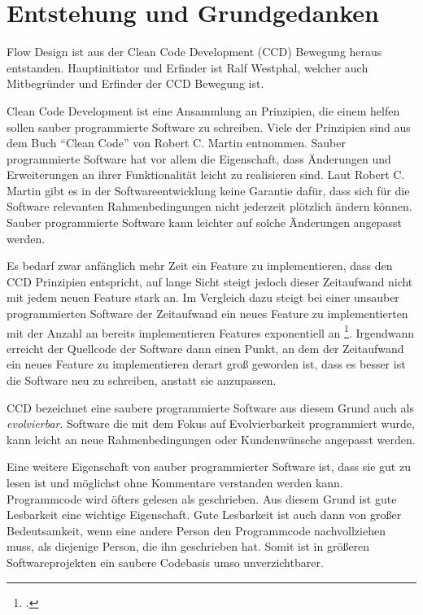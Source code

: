 \chapter{Entstehung und Grundgedanken}


Flow Design ist aus der Clean Code Development  (CCD) Bewegung heraus entstanden. Hauptinitiator und Erfinder ist Ralf Westphal, welcher auch Mitbegründer und Erfinder der CCD Bewegung ist.


Clean Code Development ist eine Ansammlung an Prinzipien, die einem helfen
sollen sauber programmierte Software zu schreiben. Viele der Prinzipien sind aus dem Buch \enquote{Clean Code} von Robert C. Martin entnommen. Sauber programmierte Software hat 
 vor allem die Eigenschaft, dass Änderungen und Erweiterungen an ihrer Funktionalität
leicht zu realisieren sind. Laut Robert C. Martin \cite{Martin2009} gibt es in der Softwareentwicklung
keine Garantie dafür, dass sich für die Software relevanten
Rahmenbedingungen nicht jederzeit plötzlich ändern können. Sauber programmierte
Software kann leichter auf solche Änderungen angepasst werden. 

Es bedarf zwar anfänglich mehr Zeit ein Feature zu implementieren, dass den CCD Prinzipien entspricht, auf lange Sicht steigt jedoch dieser Zeitaufwand nicht mit jedem neuen Feature stark
an. Im Vergleich dazu steigt bei einer unsauber programmierten Software der Zeitaufwand ein neues
Feature zu implementierten mit der Anzahl an bereits implementieren Features
exponentiell an \footcite{EVOLVIERBARKEIT}.
Irgendwann erreicht der Quellcode der Software dann einen Punkt, an
dem der Zeitaufwand ein neues Feature zu implementieren derart groß geworden ist, dass es besser ist die Software neu zu schreiben, anstatt sie anzupassen.

CCD bezeichnet eine saubere programmierte Software aus diesem Grund auch als \emph{evolvierbar}.
Software die mit dem Fokus auf Evolvierbarkeit programmiert wurde,
kann leicht an neue Rahmenbedingungen oder Kundenwünsche angepasst werden.


Eine weitere Eigenschaft von sauber programmierter Software ist, dass sie gut zu
lesen ist und möglichst ohne Kommentare verstanden werden kann.
Programmcode wird öfters gelesen als geschrieben. Aus diesem Grund ist gute
Lesbarkeit eine wichtige Eigenschaft. Gute Lesbarkeit ist auch dann von großer
Bedeutsamkeit, wenn eine andere Person den Programmcode nachvollziehen muss, als diejenige Person, die ihn geschrieben hat.
Somit ist in größeren Softwareprojekten ein saubere Codebasis umso unverzichtbarer.

